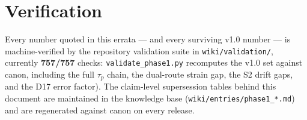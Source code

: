 \documentclass[11pt,a4paper]{article}
\begin{document}
\section{Verification}

\sloppy Every number quoted in this errata --- and every surviving v1.0
number --- is machine-verified by the repository validation suite in
\texttt{wiki/validation/}, currently \textbf{757/757} checks:
\texttt{validate\_phase1.py} recomputes the v1.0 set against canon,
including the full $\tau_p$ chain, the dual-route strain gap, the S2
drift gaps, and the D17 error factor). The claim-level supersession
tables behind this document are maintained in the knowledge base
(\texttt{wiki/entries/phase1\_*.md}) and are regenerated against canon on
every release.



\end{document}
